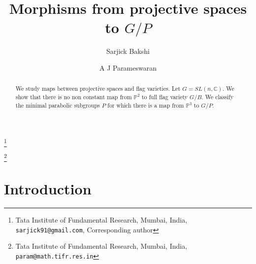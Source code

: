 \documentclass[a4paper,11pt]{amsart}
\date{}
\newcommand{\eat}[1]{}
\begin{document}
 

\eat{
\title{Morphisms from projective spaces to $G/P$}
\author{
Sarjick Bakshi \thanks{{Tata Institute of Fundamental Research, Mumbai, India, {\tt sarjick91@gmail.com}, Corresponding author}}
\and
A J Parameswaran \thanks{Tata Institute of Fundamental Research, Mumbai, India, {\tt param@math.tifr.res.in}}
}
\maketitle
}

\title{Morphisms from projective spaces to $G/P$}
\author{Sarjick Bakshi}
\thanks{Tata Institute of Fundamental Research, Mumbai, India, {\tt sarjick91@gmail.com}, Corresponding author}
\author{A J Parameswaran}
\thanks{Tata Institute of Fundamental Research, Mumbai, India, {\tt param@math.tifr.res.in}}


\maketitle





\begin{abstract} We study maps between projective spaces and flag varieties. Let $G = SL(n,\mathbb{C})$. We show that there is no non constant map from $\mathbb{P}^2$ to full flag variety $G/B$. We classify the minimal parabolic subgroups $P$ for which there is a map from $\mathbb{P}^3$ to $G/P$. 
\end{abstract}


\section{Introduction}
\end{document}

